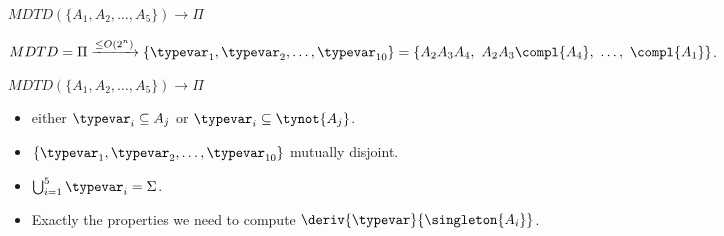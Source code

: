   
  
  

  
  
  

\begin{frame}[t]{$MDTD( \{A_1, A_2, \ldots, A_5\})\to\Pi$}
  \scalebox{0.7}{\usebox\boxforestAnu}
  
  \medskip
  
  $MDTD=\Pi \xrightarrow{\leq O(2^n)} \{\typevar_1, \typevar_2, \ldots, \typevar_{10}\} = \{A_2 A_3 A_4,~ A_2 A_3 \compl{A_4}, ~\ldots,~ \compl{A_1}\}$.  
\end{frame}

\begin{frame}[t]{$MDTD( \{A_1, A_2, \ldots, A_5\})\to\Pi$}
  \scalebox{0.65}{\usebox\boxforestAnu}
  
  \medskip
  
  \begin{itemize}
  \item {} either $\typevar_i \subseteq A_j$ or $\typevar_i \subseteq \tynot{A_j}$.
  \item{} $\{\typevar_1, \typevar_2, \ldots, \typevar_{10}\}$ mutually disjoint.
  \item {} $\bigcup_{i=1}^5\typevar_i=\Sigma$.
  \item Exactly the properties we need to compute $\deriv{\typevar}{\singleton{A_i}}$.
  \end{itemize}
\end{frame}

